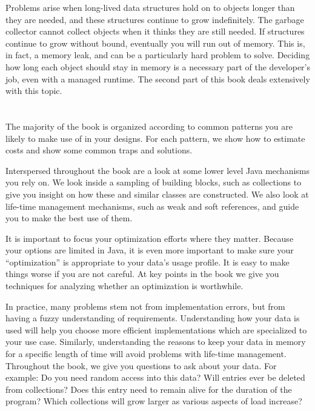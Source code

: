 Problems arise when long-lived data
structures hold on to objects longer than they are needed, and these structures
continue to grow indefinitely. The garbage collector cannot collect objects
when it thinks they are still needed. If structures continue to grow without
bound, eventually you will run out of memory. This is, in fact, a memory leak, 
and can be a particularly hard problem to solve. Deciding how long each object
should stay in memory is a necessary part of the developer's job, even with a
managed runtime. The second part of this book deals extensively with
this topic.

\section{\thetitle}

The majority of the book is organized according to common patterns you are
likely to make use of in your designs. For each pattern, we show how to estimate
costs and show some common traps and solutions.

Interspersed throughout the book are a look at some lower level Java mechanisms
you rely on. We look inside a sampling of building blocks, such as collections
to give you insight on how these and similar classes are constructed.  We also
look at life-time management mechanisms, such as weak and soft references, and
guide you to make the best use of them.

It is important to focus your optimization efforts where they matter.  Because
your options are limited in Java, it is even more important to make sure your
``optimization'' is appropriate to your data's usage profile. It is easy to make
things worse if you are not careful. At key points in the book we give you
techniques for analyzing whether an optimization is worthwhile.

In practice, many problems stem not from implementation errors, but from having
a fuzzy understanding of requirements. Understanding how your data is used will help you choose more
efficient implementations which are specialized to your use case. Similarly, 
understanding the reasons to keep your data in memory for a
specific length of time will avoid problems with life-time management. 
Throughout the book, we give you questions to ask about your data. For example:
  Do you need random access into this data? Will entries ever be
deleted from collections? Does this entry need to remain alive for the duration
of the program? Which collections will grow larger as various aspects of load
increase?


